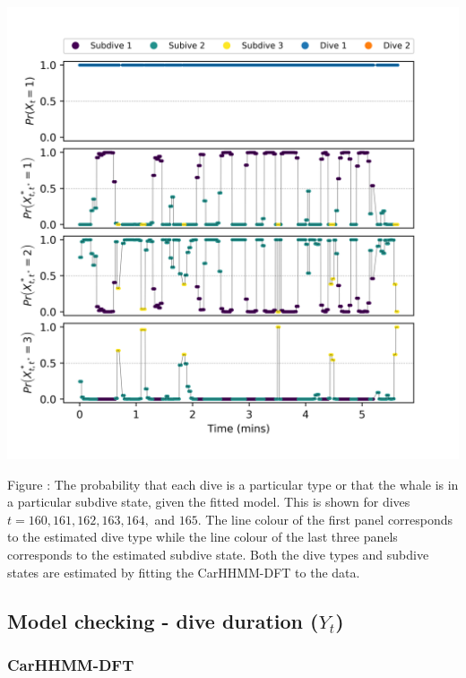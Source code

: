 \documentclass{article}
\begin{document}
        \begin{center}
        \includegraphics[width=6in]{../Plots/CarHMM_decoded_states.png}
        \end{center}
        
        \noindent Figure : The probability that each dive is a particular type or that the whale is in a particular subdive state, given the fitted model. This is shown for dives $t = 160,161,162,163,164,$ and $165$. The line colour of the first panel corresponds to the estimated dive type while the line colour of the last three panels corresponds to the estimated subdive state. Both the dive types and subdive states are estimated by fitting the CarHHMM-DFT to the data.
        \addtocounter{fignum}{1}
        
    \newpage
    \subsection{Model checking - dive duration ($Y_t$)}
    
        \subsubsection{CarHHMM-DFT}
        
\end{document}
